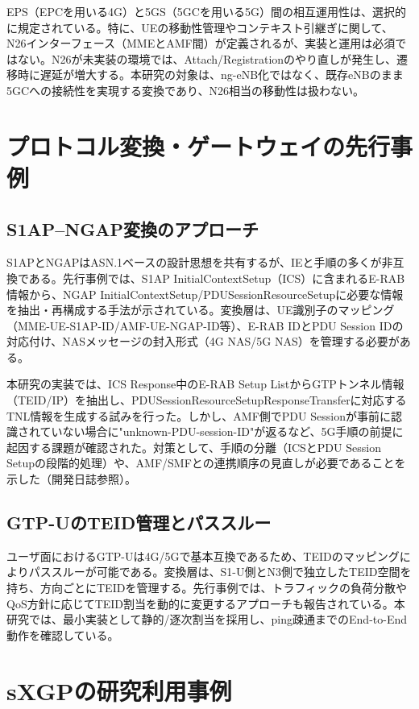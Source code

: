 EPS（EPCを用いる4G）と5GS（5GCを用いる5G）間の相互運用性は、選択的に規定されている。特に、UEの移動性管理やコンテキスト引継ぎに関して、N26インターフェース（MMEとAMF間）が定義されるが、実装と運用は必須ではない。N26が未実装の環境では、Attach/Registrationのやり直しが発生し、遷移時に遅延が増大する。本研究の対象は、ng-eNB化ではなく、既存eNBのまま5GCへの接続性を実現する変換であり、N26相当の移動性は扱わない。

\section{プロトコル変換・ゲートウェイの先行事例}

\subsection{S1AP–NGAP変換のアプローチ}

S1APとNGAPはASN.1ベースの設計思想を共有するが、IEと手順の多くが非互換である。先行事例では、S1AP InitialContextSetup（ICS）に含まれるE-RAB情報から、NGAP InitialContextSetup/PDUSessionResourceSetupに必要な情報を抽出・再構成する手法が示されている。変換層は、UE識別子のマッピング（MME-UE-S1AP-ID/AMF-UE-NGAP-ID等）、E-RAB IDとPDU Session IDの対応付け、NASメッセージの封入形式（4G NAS/5G NAS）を管理する必要がある。

本研究の実装では、ICS Response中のE-RAB Setup ListからGTPトンネル情報（TEID/IP）を抽出し、PDUSessionResourceSetupResponseTransferに対応するTNL情報を生成する試みを行った。しかし、AMF側でPDU Sessionが事前に認識されていない場合に"unknown-PDU-session-ID"が返るなど、5G手順の前提に起因する課題が確認された。対策として、手順の分離（ICSとPDU Session Setupの段階的処理）や、AMF/SMFとの連携順序の見直しが必要であることを示した（開発日誌参照）。

\subsection{GTP-UのTEID管理とパススルー}

ユーザ面におけるGTP-Uは4G/5Gで基本互換であるため、TEIDのマッピングによりパススルーが可能である。変換層は、S1-U側とN3側で独立したTEID空間を持ち、方向ごとにTEIDを管理する。先行事例では、トラフィックの負荷分散やQoS方針に応じてTEID割当を動的に変更するアプローチも報告されている。本研究では、最小実装として静的/逐次割当を採用し、ping疎通までのEnd-to-End動作を確認している。

\section{sXGPの研究利用事例}

